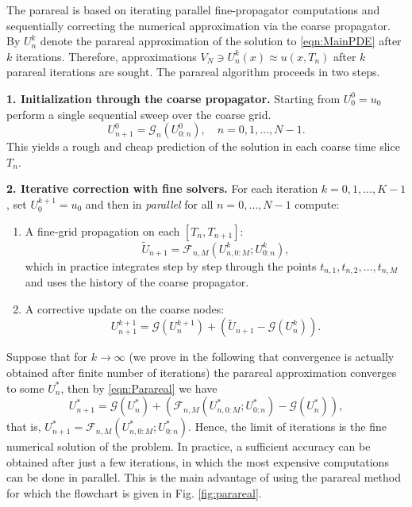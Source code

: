 \documentclass[12pt,a4paper]{article}
\begin{document}
The parareal is based on iterating parallel fine-propagator computations and sequentially correcting the numerical approximation via the coarse propagator. By $U^k_n$ denote the parareal approximation of the solution to \eqref{eqn:MainPDE} after $k$ iterations. Therefore, approximations $V_N \ni U_n^k(x) \approx u(x, T_n)$ after $k$ parareal iterations are sought. The parareal algorithm proceeds in two steps. 

\medskip
\noindent\textbf{1. Initialization through the coarse propagator.}  
Starting from \(U_0^0 = u_0\) perform a single sequential sweep over the coarse grid.
\begin{equation}
	U_{n+1}^0 = \mathcal{G}_n\left(U^0_{0:n}\right), \quad n = 0,1,\dots,N-1.
\end{equation}
This yields a rough and cheap prediction of the solution in each coarse time slice \(T_n\).

\medskip
\noindent\textbf{2. Iterative correction with fine solvers.}  
For each iteration \(k = 0,1,\dots,K-1\), set \(U_0^{k+1} = u_0\) and then in \emph{parallel} for all \(n=0,\dots,N-1\) compute:

\begin{enumerate}
	\item[a)] A fine‐grid propagation on each \([T_n, T_{n+1}]\):
	\begin{equation}
		\widetilde U_{n+1} = \mathcal{F}_{n, M}\left(U^k_{n, 0:M}; U^k_{0:n}\right),
	\end{equation}
	which in practice integrates step by step through the points \(t_{n,1},t_{n,2},\dots,t_{n,M}\) and uses the history of the coarse propagator. 
	\item[b)] A corrective update on the coarse nodes:
	\begin{equation}\label{eqn:Parareal}
		U_{n+1}^{k+1} = \mathcal{G}\left(U_n^{k+1}\right) + \left(\widetilde U_{n+1} - \mathcal{G}\left(U_n^k\right)\right).
	\end{equation}
\end{enumerate}
Suppose that for $k\rightarrow\infty$ (we prove in the following that convergence is actually obtained after finite number of iterations) the parareal approximation converges to some $U^*_n$, then by \eqref{eqn:Parareal} we have
\begin{equation}\label{eqn:PararealConvergence}
	U^*_{n+1} = \mathcal{G}\left(U_n^{*}\right) + \left(\mathcal{F}_{n, M}\left(U^*_{n, 0:M}; U^*_{0:n}\right)- \mathcal{G}\left(U_n^*\right)\right),
\end{equation}
that is, \(U^*_{n+1} = \mathcal{F}_{n, M}\left(U^*_{n, 0:M}; U^*_{0:n}\right)\). Hence, the limit of iterations is the fine numerical solution of the problem. In practice, a sufficient accuracy can be obtained after just a few iterations, in which the most expensive computations can be done in parallel. This is the main advantage of using the parareal method for which the flowchart is given in Fig. \ref{fig:parareal}.
\end{document}
